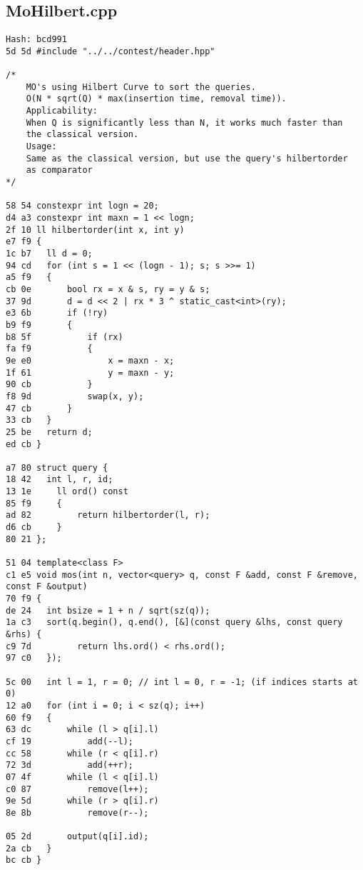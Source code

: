 \documentclass[11pt, a4paper, twoside]{article}
\begin{document}
\subsection{MoHilbert.cpp}
\begin{lstlisting}
Hash: bcd991
5d 5d #include "../../contest/header.hpp"

/*
	MO's using Hilbert Curve to sort the queries.
    O(N * sqrt(Q) * max(insertion time, removal time)).
    Applicability:
    When Q is significantly less than N, it works much faster than
	the classical version.
    Usage:
    Same as the classical version, but use the query's hilbertorder 
	as comparator
*/

58 54 constexpr int logn = 20;
d4 a3 constexpr int maxn = 1 << logn;
2f 10 ll hilbertorder(int x, int y)
e7 f9 {
1c b7 	ll d = 0;
94 cd 	for (int s = 1 << (logn - 1); s; s >>= 1)
a5 f9 	{
cb 0e 		bool rx = x & s, ry = y & s;
37 9d 		d = d << 2 | rx * 3 ^ static_cast<int>(ry);
e3 6b 		if (!ry)
b9 f9 		{
b8 5f 			if (rx)
fa f9 			{
9e e0 				x = maxn - x;
1f 61 				y = maxn - y;
90 cb 			}
f8 9d 			swap(x, y);
47 cb 		}
33 cb 	}
25 be 	return d;
ed cb }
 
a7 80 struct query {
18 42 	int l, r, id;
13 1e     ll ord() const
85 f9     {
ad 82         return hilbertorder(l, r);
d6 cb     }
80 21 };

51 04 template<class F>
c1 e5 void mos(int n, vector<query> q, const F &add, const F &remove, const F &output)
70 f9 {
de 24 	int bsize = 1 + n / sqrt(sz(q));
1a c3 	sort(q.begin(), q.end(), [&](const query &lhs, const query &rhs) {
c9 7d         return lhs.ord() < rhs.ord();
97 c0 	});
      
5c 00 	int l = 1, r = 0; // int l = 0, r = -1; (if indices starts at 0)
12 a0 	for (int i = 0; i < sz(q); i++)
60 f9 	{
63 dc 		while (l > q[i].l)
cf 19 			add(--l);
cc 58 		while (r < q[i].r)
72 3d 			add(++r);
07 4f 		while (l < q[i].l)
c0 87 			remove(l++);
9e 5d 		while (r > q[i].r)
8e 8b 			remove(r--);
      
05 2d 		output(q[i].id);
2a cb 	}
bc cb }
\end{lstlisting}
\end{document}
